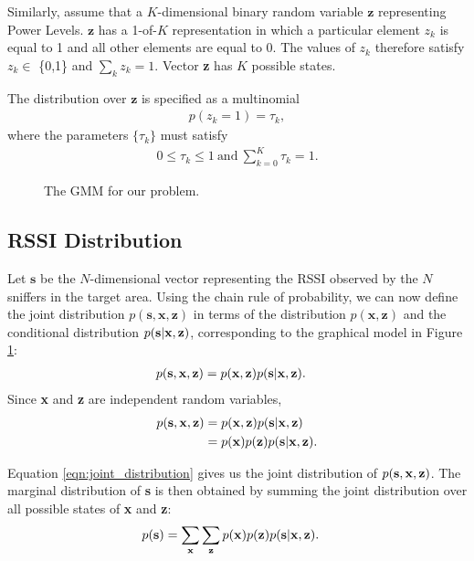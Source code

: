 Similarly, assume that a $K$-dimensional binary random variable $\mathbf{z}$ representing Power Levels. $\mathbf{z}$ has a 1-of-$K$ representation in which a particular element $z_{k}$ is equal to 1 and all other elements are equal to 0. The values of $z_{k}$ therefore satisfy $z_{k} \in$ \{0,1\} and $\sum_{k} z_{k} = 1$. Vector {\bf z} has $K$ possible states.

The distribution over $\mathbf{z}$ is specified as a multinomial 
\begin{align}
p(z_{k} = 1) = \tau_{k},
\end{align}
where the parameters $\{\tau_{k}\}$ must satisfy
\begin{align}
0 \le \tau_{k} \le 1 \ \text{and} \  \sum_{k=0}^{K} \tau_{k} = 1.
\end{align}


\begin{figure} [h!]
\centering
{}
\caption{The GMM for our problem.}
\label{fig:gmm}
\end{figure}


\subsection{RSSI Distribution}
\label{subsec:constructingthedistributionovertheobservedsignalstrengths}

Let $\mathbf{s}$ be the $N$-dimensional vector representing the RSSI observed by the $N$ sniffers in the target area. 
Using the chain rule of probability, we can now define the joint distribution $p(\mathbf{s}, \mathbf{x},\mathbf{z})$ in terms of the distribution $p(\mathbf{x},\mathbf{z})$ and the conditional distribution $p( {\bf s} | {\bf x}, {\bf z})$, 
corresponding to the graphical model in Figure \ref{fig:gmm}:
\begin{align}
p( {\bf s}, {\bf x}, {\bf z}) &= p( {\bf x}, {\bf z}) p( {\bf s} | {\bf x}, {\bf z}).
\end{align}
Since {\bf x} and {\bf z} are independent random variables,
\begin{align}
p( {\bf s}, {\bf x}, {\bf z}) &= p( {\bf x}, {\bf z}) p( {\bf s} | {\bf x}, {\bf z}) \nonumber \\
&= p({\bf x})p({\bf z})p( {\bf s} | {\bf x}, {\bf z}). \label{eqn:joint_distribution}
\end{align}

Equation \ref{eqn:joint_distribution} gives us the joint distribution of $ p( {\bf s}, {\bf x}, {\bf z}) $. The marginal distribution of {\bf s} is then obtained by summing the joint distribution over all possible states of {\bf x} and {\bf z}:
\begin{align}
p( {\bf s}) & = \sum_{\bf x}\sum_{\bf z} p({\bf x})p({\bf z})p({\bf s}|{\bf x}, {\bf z}).\label{eqn:marginal_distribution1}
\end{align}

